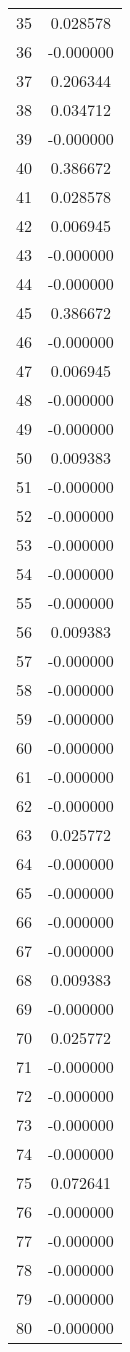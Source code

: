 \documentclass[12pt]{article}
\begin{document}
\begin{longtable}{@{}cc@{}}
35 & 0.028578 \\
36 & -0.000000 \\
37 & 0.206344 \\
38 & 0.034712 \\
39 & -0.000000 \\
40 & 0.386672 \\
41 & 0.028578 \\
42 & 0.006945 \\
43 & -0.000000 \\
44 & -0.000000 \\
45 & 0.386672 \\
46 & -0.000000 \\
47 & 0.006945 \\
48 & -0.000000 \\
49 & -0.000000 \\
50 & 0.009383 \\
51 & -0.000000 \\
52 & -0.000000 \\
53 & -0.000000 \\
54 & -0.000000 \\
55 & -0.000000 \\
56 & 0.009383 \\
57 & -0.000000 \\
58 & -0.000000 \\
59 & -0.000000 \\
60 & -0.000000 \\
61 & -0.000000 \\
62 & -0.000000 \\
63 & 0.025772 \\
64 & -0.000000 \\
65 & -0.000000 \\
66 & -0.000000 \\
67 & -0.000000 \\
68 & 0.009383 \\
69 & -0.000000 \\
70 & 0.025772 \\
71 & -0.000000 \\
72 & -0.000000 \\
73 & -0.000000 \\
74 & -0.000000 \\
75 & 0.072641 \\
76 & -0.000000 \\
77 & -0.000000 \\
78 & -0.000000 \\
79 & -0.000000 \\
80 & -0.000000 \\

\end{longtable}
\end{document}
